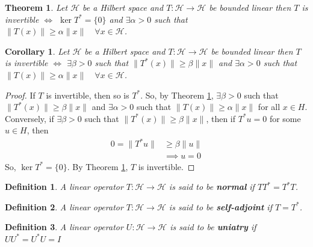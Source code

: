 \documentclass{beamer}
\newtheorem{thm}{Theorem}
\newtheorem{defn}{Definition}
\newtheorem{cor}{Corollary}
\begin{document}
  \begin{frame}{\subsecname}
    \begin{thm} \label{Inv}
      Let $\mathcal{H}$ be a Hilbert space and $T: \mathcal{H}\rightarrow\mathcal{H}$ be bounded linear then $T$ is invertible $\Longleftrightarrow$  $\operatorname{ker}T^{*}=\{0\}$ and $\exists \alpha>0$ such that $\|T(x)\| \geqslant \alpha\|x\| \quad \forall x \in\mathcal{H}$.
    \end{thm}
    \pause
    \begin{cor} \label{CorInv}
    Let $\mathcal{H}$ be a Hilbert space and $T: \mathcal{H}\rightarrow\mathcal{H}$ be bounded linear then $T$ is invertible $\Longleftrightarrow$ $\exists \beta>0$ such that $\|T^{*}(x)\| \geqslant \beta\|x\|$ and $\exists \alpha>0$ such that $\|T(x)\| \geqslant \alpha\|x\| \quad \forall x \in\mathcal{H}$.
    \end{cor}
  \end{frame}

  \begin{frame}{\subsecname}
    \begin{proof}
      If $T$ is invertible, then so is $T^{*}$. So, by Theorem \ref{Inv}, $\exists \beta>0$ such that $\|T^{*}(x)\| \geqslant \beta\|x\|$ and $\exists \alpha>0$ such that $\|T(x)\| \geqslant \alpha\|x\|$ for all $x\in H$. Conversely, if $\exists \beta>0$ such that $\|T^{*}(x)\| \geqslant \beta\|x\|$, then if $T^{*}u=0$ for some $u\in H$, then
      $$
      \begin{aligned}
      0 = \lVert T^{*}u\rVert&\geq\beta\lVert u\rVert \\
                             &\implies u=0
      \end{aligned}
      $$
      So, $\ker T^{*}=\{0\}$. By Theorem \ref{Inv}, $T$ is invertible.
    \end{proof}
  \end{frame}

  \begin{frame}{\subsecname}
    \begin{defn}
      A linear operator $T:\mathcal{H}\to\mathcal{H}$ is said to be \textbf{normal} if $TT^{*}=T^{*}T$.
    \end{defn}
    \begin{defn}
      A linear operator $T:\mathcal{H}\to\mathcal{H}$ is said to be \textbf{self-adjoint} if $T=T^{*}$.
    \end{defn}
    \begin{defn}
      A linear operator $U:\mathcal{H}\to\mathcal{H}$ is said to be \textbf{uniatry} if $UU^{*}=U^{*}U=I$
    \end{defn}
  \end{frame}
\end{document}
